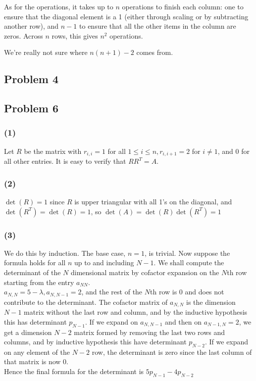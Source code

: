 \documentclass{article}
\begin{document}
As for the operations, it takes up to $n$ operations to finish each column:
one to ensure that the diagonal element is a 1 (either through scaling or by
subtracting another row), and $n-1$ to ensure that all the other items in the
column are zeros. Across $n$ rows, this gives $n^2$ operations.

We're really not sure where $n(n+1) - 2$ comes from.

\subsection{Problem 4}

\subsection{Problem 6}
\subsubsection{(1)} Let $R$ be the matrix with $r_{i,i}=1$ for all $1\le i\le n, r_{i,i+1}=2$ for $i\neq 1$, and 0 for all other entries. It is easy to verify that $RR^T=A$. 
\subsubsection{(2)} $\det(R)=1$ since $R$ is upper triangular with all 1's on the diagonal, and $\det(R^T)=\det(R)=1$, so $\det(A)=\det(R)\det(R^T)=1$
\subsubsection{(3)} We do this by induction. The base case, $n=1$, is trivial. Now suppose the formula holds for all $n$ up to and including $N-1$. We shall compute the determinant of the $N$ dimensional matrix by cofactor expansion on the $N$th row starting from the entry $a_{NN}$. 
\\$a_{N,N}=5-\lambda,a_{N,N-1}=2$, and the rest of the $N$th row is 0 and does not contribute to the determinant. The cofactor matrix of $a_{N,N}$ is the dimension $N-1$ matrix without the last row and column, and by the inductive hypothesis this has determinant $p_{N-1}$. If we expand on $a_{N,N-1}$ and then on $a_{N-1,N}=2$, we get a dimension $N-2$ matrix formed by removing the last two rows and columns, and by inductive hypothesis this have determinant $p_{N-2}$. If we expand on any element of the $N-2$ row, the determinant is zero since the last column of that matrix is now 0.
\\Hence the final formula for the determinant is $5p_{N-1}-4p_{N-2}$
\end{document}
